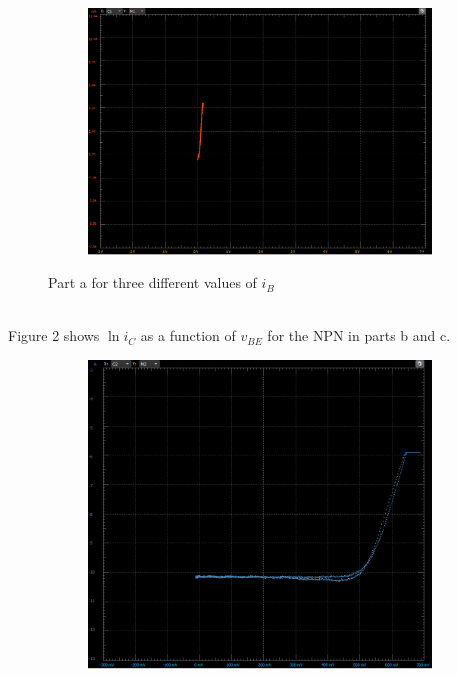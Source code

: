 \documentclass[12pt]{article}
\begin{document}
\begin{enumerate}
\begin{enumerate}
\begin{figure}[h!]
\begin{subfigure}[b]{0.31\textwidth}
            \end{subfigure}
            ~
            \begin{subfigure}[b]{0.31\textwidth}
                \includegraphics[width=\textwidth]{N1VB700.png}
            \end{subfigure}
            \caption{Part a for three different values of $i_B$}
        \end{figure} \\
        Figure 2 shows $\ln i_C$ as a function of $v_{BE}$ for the NPN in parts b and c. \\
        \begin{figure}[h!]
            \centering
            \begin{subfigure}[b]{0.48\textwidth}
                \includegraphics[width=\textwidth]{NBC4.png}

\end{subfigure}
\end{figure}
\end{enumerate}
\end{enumerate}
\end{document}
